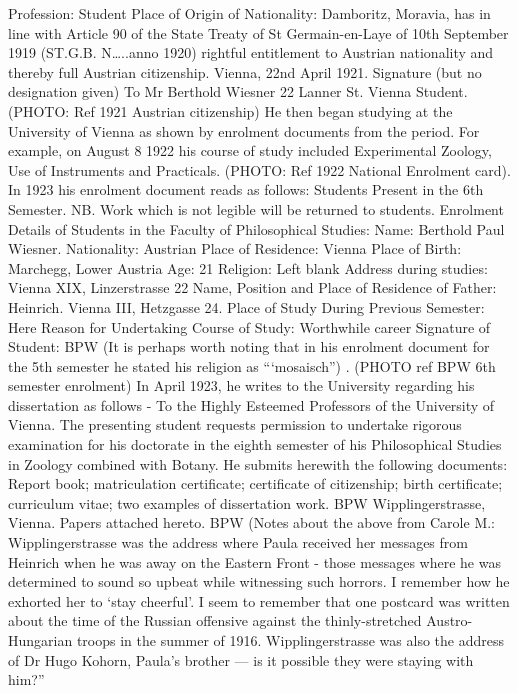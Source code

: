 Profession: Student Place of Origin of Nationality: Damboritz, Moravia, has in line with
Article 90 of the State Treaty of St Germain-en-Laye of 10th September 1919 (ST.G.B. N…..anno
1920) rightful entitlement to Austrian nationality and thereby full Austrian citizenship.
Vienna, 22nd April 1921. Signature (but no designation given)
To Mr Berthold Wiesner 22 Lanner St. Vienna Student.
(PHOTO: Ref 1921 Austrian citizenship)
He then began studying at the University of Vienna as shown by enrolment documents from the
period. For example, on August 8 1922 his course of study included Experimental Zoology, Use of
Instruments and Practicals. (PHOTO: Ref 1922 National Enrolment card).
In 1923 his enrolment document reads as follows:
Students Present in the 6th Semester.
NB. Work which is not legible will be returned to students. Enrolment Details of Students in the
Faculty of Philosophical Studies: Name: Berthold Paul Wiesner. Nationality: Austrian Place of
Residence: Vienna Place of Birth: Marchegg, Lower Austria Age: 21 Religion: Left blank
Address during studies: Vienna XIX, Linzerstrasse 22 Name, Position and Place of Residence of
Father: Heinrich. Vienna III, Hetzgasse 24. Place of Study During Previous Semester: Here
Reason for Undertaking Course of Study: Worthwhile career
Signature of Student: BPW
(It is perhaps worth noting that in his enrolment document for the 5th semester he stated his religion
as “‘mosaisch”) .
(PHOTO ref BPW 6th semester enrolment)
In April 1923, he writes to the University regarding his dissertation as follows -
To the Highly Esteemed Professors of the University of Vienna.
The presenting student requests permission to undertake rigorous examination for his doctorate in
the eighth semester of his Philosophical Studies in Zoology combined with Botany. He submits
herewith the following documents: Report book; matriculation certificate; certificate of citizenship;
birth certificate; curriculum vitae; two examples of dissertation work. BPW Wipplingerstrasse,
Vienna.
Papers attached hereto.
BPW
(Notes about the above from Carole M.:
Wipplingerstrasse was the address where Paula received her messages from Heinrich when he was
away on the Eastern Front - those messages where he was determined to sound so upbeat while
witnessing such horrors. I remember how he exhorted her to ‘stay cheerful’. I seem to remember
that one postcard was written about the time of the Russian offensive against the thinly-stretched
Austro-Hungarian troops in the summer of 1916. Wipplingerstrasse was also the address of Dr
Hugo Kohorn, Paula’s brother — is it possible they were staying with him?”
